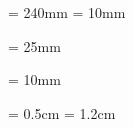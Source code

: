 \documentclass[11pt,a4paper,oneside]{article}
\begin{document}
	\setcounter{tocdepth}{4}
	\setcounter{section}{0}
	\setcounter{subsection}{0}
	\setcounter{subsubsection}{0}
	\textheight = 240mm
	\footskip = 10mm
    
    { %
        \leftskip = 25mm
    	
        \leftskip = 10mm
    }
    
    
    
	\headheight = 0.5cm %
	\headsep = 1.2cm %
	
	
	
\end{document}
